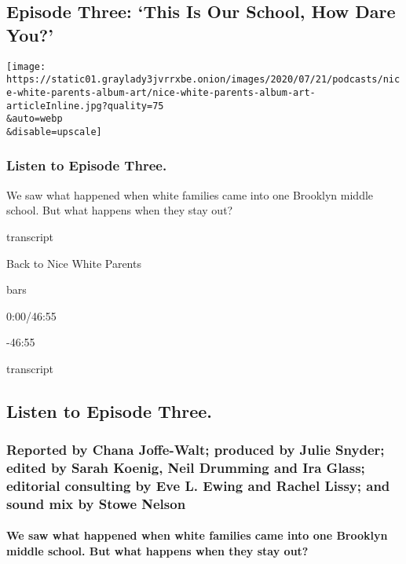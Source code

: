 \hypertarget{episode-three-this-is-our-school-how-dare-you}{%
\subsection{Episode Three: `This Is Our School, How Dare
You?'}\label{episode-three-this-is-our-school-how-dare-you}}

\texttt{[image: https://static01.graylady3jvrrxbe.onion/images/2020/07/21/podcasts/nice-white-parents-album-art/nice-white-parents-album-art-articleInline.jpg?quality=75\\\&auto=webp\\\&disable=upscale]}

\hypertarget{listen-to-episode-three}{%
\subsubsection{Listen to Episode Three.}\label{listen-to-episode-three}}

We saw what happened when white families came into one Brooklyn middle
school. But what happens when they stay out?

transcript

Back to Nice White Parents

bars

0:00/46:55

-46:55

transcript

\hypertarget{listen-to-episode-three-1}{%
\subsection{Listen to Episode Three.}\label{listen-to-episode-three-1}}

\hypertarget{reported-by-chana-joffe-walt-produced-by-julie-snyder-edited-by-sarah-koenig-neil-drumming-and-ira-glass-editorial-consulting-by-eve-l-ewing-and-rachel-lissy-and-sound-mix-by-stowe-nelson-3}{%
\subsubsection{Reported by Chana Joffe-Walt; produced by Julie Snyder;
edited by Sarah Koenig, Neil Drumming and Ira Glass; editorial
consulting by Eve L. Ewing and Rachel Lissy; and sound mix by Stowe
Nelson}\label{reported-by-chana-joffe-walt-produced-by-julie-snyder-edited-by-sarah-koenig-neil-drumming-and-ira-glass-editorial-consulting-by-eve-l-ewing-and-rachel-lissy-and-sound-mix-by-stowe-nelson-3}}

\hypertarget{we-saw-what-happened-when-white-families-came-into-one-brooklyn-middle-school-but-what-happens-when-they-stay-out}{%
\paragraph{We saw what happened when white families came into one
Brooklyn middle school. But what happens when they stay
out?}\label{we-saw-what-happened-when-white-families-came-into-one-brooklyn-middle-school-but-what-happens-when-they-stay-out}}

